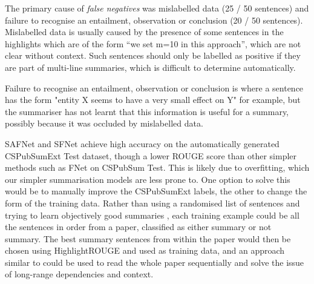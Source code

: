 \documentclass[11pt,a4paper]{article}
\begin{document}
The primary cause of \textit{false negatives} was mislabelled data (25 / 50 sentences) and failure to recognise an entailment, observation or conclusion (20 / 50 sentences). Mislabelled data is usually caused by the presence of some sentences in the highlights which are of the form ``we set m=10 in this approach'', which are not clear without context. %
Such sentences should only be labelled as positive if they are part of multi-line summaries, which is difficult to determine automatically.%

Failure to recognise an entailment, observation or conclusion is where a sentence has the form "entity X seems to have a very small effect on Y" for example, but the summariser has not learnt that this information is useful for a summary, possibly because it was occluded by mislabelled data.

SAFNet and SFNet achieve high accuracy on the automatically generated CSPubSumExt Test dataset, though a lower ROUGE score than other simpler methods such as FNet on CSPubSum Test. This is likely due to overfitting, which our simpler summarisation models are less prone to.
One option to solve this would be to manually improve the CSPubSumExt labels, the other to change the form of the training data.
Rather than using a randomised list of sentences and trying to learn objectively good summaries \cite{Cao2015}, each training example could be all the sentences in order from a paper, classified as either summary or not summary. The best summary sentences from within the paper would then be chosen using HighlightROUGE and used as training data, and an approach similar to  could be used to read the whole paper sequentially and solve the issue of long-range dependencies and context.
\end{document}
